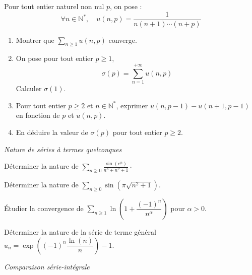 \documentclass[a4paper,twoside,french,11pt]{VcCours}
\newcommand{\Sum}[2]{\ensuremath{\textstyle{\sum\limits_{#1}^{#2}}}}
\begin{document}
\begin{Exercice} Pour tout entier naturel non nul $p$, on pose :
$$ \forall n \in \mathbb{N}^*, \quad u(n,p) = \frac{1}{n(n+1)\cdots(n+p)}$$

\begin{enumerate}
\item Montrer que $\Sum{n \geq 1}{}  u(n,p)$ converge.
\item On pose pour tout entier $p \geq 1$,
$$ \sigma(p) = \sum_{n=1}^{+ \infty} u(n,p)$$
Calculer $\sigma(1)$.
\item Pour tout entier $p \geq 2$ et $n \in \mathbb{N}^*$, exprimer $u(n,p-1)-u(n+1,p-1)$ en fonction de $p$ et $u(n,p)$.
\item En déduire la valeur de $\sigma(p)$ pour tout entier $p \geq 2$.
\end{enumerate}
\end{Exercice}




\medskip

\begin{center}
\textit{{ {\large Nature de séries à termes quelconques}}}
\end{center}

\medskip

\begin{Exercice} Déterminer la nature de $\Sum{n \geq 0}{} \frac{\sin(e^n)}{n^3+n^2+1} \cdot$
\end{Exercice}

\begin{Exercice}[$\bigstar$] Déterminer la nature de $\Sum{n \geq 0}{} \sin \left({\pi \sqrt {n^2 + 1}} \right)$.
\end{Exercice}



\begin{Exercice} Étudier la convergence de $\Sum{n \geq 1}{} \ln \left( 1 + \dfrac{(-1)^n}{n^{\alpha}} \right)$ pour $\alpha>0$.
\end{Exercice} 


\begin{Exercice} Déterminer la nature de la série de terme général $u_n = \exp \left( (-1)^n \dfrac{\ln(n)}{n} \right)-1$.
\end{Exercice}


\medskip

\begin{center}
\textit{{ {\large Comparaison série-intégrale}}}
\end{center}

\medskip
\end{document}
